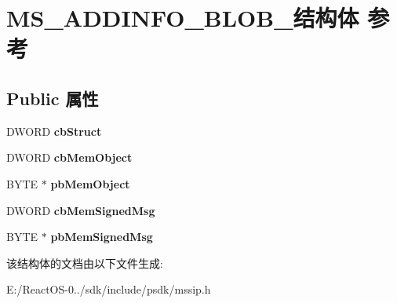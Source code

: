 \hypertarget{struct_m_s___a_d_d_i_n_f_o___b_l_o_b__}{}\section{M\+S\+\_\+\+A\+D\+D\+I\+N\+F\+O\+\_\+\+B\+L\+O\+B\+\_\+结构体 参考}
\label{struct_m_s___a_d_d_i_n_f_o___b_l_o_b__}
\subsection*{Public 属性}
\begin{DoxyCompactItemize}
\item 
\mbox{\label{struct_m_s___a_d_d_i_n_f_o___b_l_o_b___aa0c9cd8bf1fe61719245345dd7f22b21}} 
D\+W\+O\+RD {\bfseries cb\+Struct}
\item 
\mbox{\label{struct_m_s___a_d_d_i_n_f_o___b_l_o_b___a1f49408c7d57a6104149c3dcdb2fe8bb}} 
D\+W\+O\+RD {\bfseries cb\+Mem\+Object}
\item 
\mbox{\label{struct_m_s___a_d_d_i_n_f_o___b_l_o_b___a2f51e979bfbf6d7e1188215792578773}} 
B\+Y\+TE $\ast$ {\bfseries pb\+Mem\+Object}
\item 
\mbox{\label{struct_m_s___a_d_d_i_n_f_o___b_l_o_b___ab63c8b40db389511b4ea56e09f30912c}} 
D\+W\+O\+RD {\bfseries cb\+Mem\+Signed\+Msg}
\item 
\mbox{\label{struct_m_s___a_d_d_i_n_f_o___b_l_o_b___a4522e07c0c390ce2213b5d1d1f342f0c}} 
B\+Y\+TE $\ast$ {\bfseries pb\+Mem\+Signed\+Msg}
\end{DoxyCompactItemize}


该结构体的文档由以下文件生成\+:\begin{DoxyCompactItemize}
\item 
E\+:/\+React\+O\+S-\/0../sdk/include/psdk/mssip.\+h\end{DoxyCompactItemize}
